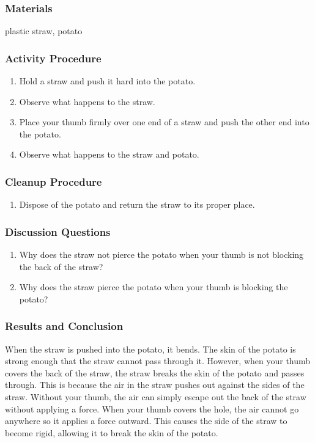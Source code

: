 \subsubsection*{Materials}
plastic straw, potato

\subsubsection*{Activity Procedure}
\begin{enumerate}
\item{Hold a straw and push it hard into the potato.}
\item{Observe what happens to the straw.}
\item{Place your thumb firmly over one end of a straw and push the other end into the potato.}
\item{Observe what happens to the straw and potato.}
\end{enumerate}

\subsubsection*{Cleanup Procedure}
\begin{enumerate}
\item{Dispose of the potato and return the straw to its proper place.}
\end{enumerate}

\subsubsection*{Discussion Questions}
\begin{enumerate}
\item{Why does the straw not pierce the potato when your thumb is not blocking the back of the straw?}
\item{Why does the straw pierce the potato when your thumb is blocking the potato?}
\end{enumerate}

\subsubsection*{Results and Conclusion}
When the straw is pushed into the potato, it bends.  The skin of the potato is strong enough that the straw cannot pass through it.  However, when your thumb covers the back of the straw, the straw breaks the skin of the potato and passes through.  This is because the air in the straw pushes out against the sides of the straw.  Without your thumb, the air can simply escape out the back of the straw without applying a force.  When your thumb covers the hole, the air cannot go anywhere so it applies a force outward.  This causes the side of the straw to become rigid, allowing it to break the skin of the potato.

